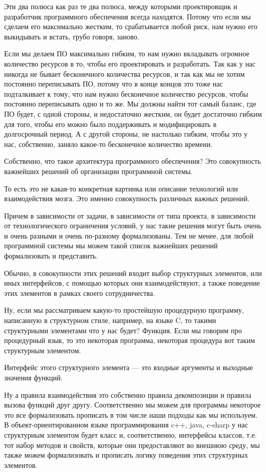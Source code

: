Эти два полюса как раз те два полюса, между которыми проектировщик и разработчик программного обеспечения всегда находятся. Потому что если мы сделаем его максимально жестким, то срабатывается любой риск, нам нужно его выкидывать и встать, грубо говоря, заново.

Если мы делаем ПО максимально гибким, то нам нужно вкладывать огромное количество ресурсов в то, чтобы его проектировать и разработать. Так как у нас никогда не бывает бесконечного количества ресурсов, и так как мы не хотим постоянно переписывать ПО, потому что в конце концов это тоже нас подталкивает к тому, что нам нужно бесконечное количество ресурсов, чтобы постоянно переписывать одно и то же. Мы должны найти тот самый баланс, где ПО будет, с одной стороны, и недостаточно жестким, он будет достаточно гибким для того, чтобы его можно было поддерживать и модифицировать в долгосрочный период. А с другой стороны, не настолько гибким, чтобы это у нас, собственно, заняло какое-то бесконечное количество времени. 

Собственно, что такое архитектура программного обеспечения? Это совокупность важнейших решений об организации программной системы.

То есть это не какая-то конкретная картинка или описание технологий или взаимодействия мозга. Это именно совокупность различных важных решений.

Причем в зависимости от задачи, в зависимости от типа проекта, в зависимости от технологического ограничения условий, у нас такие решения могут быть очень и очень разными и очень по-разному формализованы. Тем не менее, для любой программной системы мы можем такой список важнейших решений формализовать и представить.

Обычно, в совокупности этих решений входит выбор структурных элементов, или иных интерфейсов, 
с помощью которых они взаимодействуют, а также поведение этих элементов в рамках своего сотрудничества. 

Ну, если мы рассматриваем какую-то простейшую процедурную программу, написанную в структурном стиле, например, на языке C, то такими структурными элементами что у нас будет? Функция. Если мы говорим про процедурный язык, то это некоторая программа, некоторая процедура вот таким структурным элементом.

Интерфейс этого структурного элемента --- это входные аргументы и выходные значения функций.

Ну а правила взаимодействия это собственно правила декомпозиции и правила вызова функций друг другу. Соответственно мы можем для программы некоторое это все формализовать прописать в том числе наши подходы как мы используем. В объект-ориентированном языке программирования c++, java, c-sharp у нас структурным элементом будет класс и, соответственно, интерфейсы классов, т.е. тот набор методов и свойств, которые они предоставляют во внешнюю среду, мы также можем формализовать и прописать логику поведения этих структурных элементов. 

